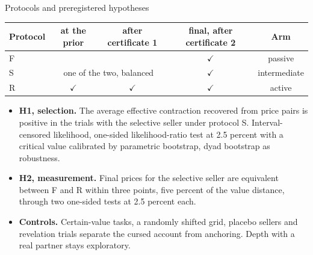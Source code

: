 \documentclass[aspectratio=169,11pt]{beamer}
\begin{document}
\begin{frame}{Protocols and preregistered hypotheses}
\begin{center}
\begin{tabular}{lcccc}
\toprule
Protocol & at the prior & after certificate 1 & final, after certificate 2 & Arm\\
\midrule
F & & & $\checkmark$ & passive\\
S & \multicolumn{2}{c}{one of the two, balanced} & $\checkmark$ & intermediate\\
R & $\checkmark$ & $\checkmark$ & $\checkmark$ & active\\
\bottomrule
\end{tabular}
\end{center}
\begin{itemize}
\item \textbf{H1, selection.} The average effective contraction recovered from price pairs is positive in the trials with the selective seller under protocol S. Interval-censored likelihood, one-sided likelihood-ratio test at 2.5 percent with a critical value calibrated by parametric bootstrap, dyad bootstrap as robustness.
\item \textbf{H2, measurement.} Final prices for the selective seller are equivalent between F and R within three points, five percent of the value distance, through two one-sided tests at 2.5 percent each.
\item \textbf{Controls.} Certain-value tasks, a randomly shifted grid, placebo sellers and revelation trials separate the cursed account from anchoring. Depth with a real partner stays exploratory.
\end{itemize}
\end{frame}
\end{document}
